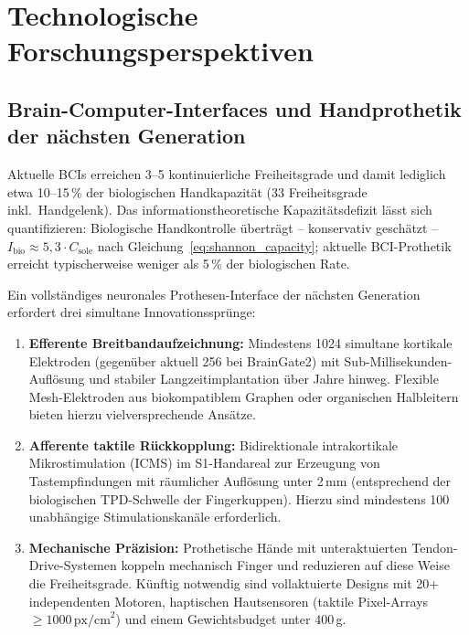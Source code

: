 ﻿\documentclass[12pt,a4paper]{report}
\theoremstyle{plain}
\theoremstyle{definition}
\theoremstyle{remark}
\begin{document}
\section{Technologische Forschungsperspektiven}

\subsection{Brain-Computer-Interfaces und Handprothetik der nächsten Generation}

Aktuelle BCIs erreichen 3--5 kontinuierliche Freiheitsgrade und damit
lediglich etwa 10--15\,\% der biologischen Handkapazität (33 Freiheitsgrade
inkl.\ Handgelenk). Das informationstheoretische Kapazitätsdefizit
lässt sich quantifizieren: Biologische Handkontrolle überträgt --
konservativ geschätzt -- $I_{\mathrm{bio}} \approx 5{,}3 \cdot
C_{\mathrm{sole}}$ nach Gleichung~\eqref{eq:shannon_capacity};
aktuelle BCI-Prothetik erreicht typischerweise weniger als 5\,\%
der biologischen Rate.

Ein vollständiges neuronales Prothesen-Interface der nächsten Generation
erfordert drei simultane Innovationssprünge:

\begin{enumerate}
\item \textbf{Efferente Breitbandaufzeichnung:} Mindestens 1024 simultane
  kortikale Elektroden (gegenüber aktuell 256 bei BrainGate2) mit
  Sub-Millisekunden-Auflösung und stabiler Langzeitimplantation über
  Jahre hinweg. Flexible Mesh-Elektroden aus biokompatiblem Graphen
  oder organischen Halbleitern bieten hierzu vielversprechende Ansätze.
\item \textbf{Afferente taktile Rückkopplung:} Bidirektionale
  intrakortikale Mikrostimulation (ICMS) im S1-Handareal zur Erzeugung
  von Tastempfindungen mit räumlicher Auflösung unter 2\,mm
  (entsprechend der biologischen TPD-Schwelle der Fingerkuppen).
  Hierzu sind mindestens 100 unabhängige Stimulationskanäle erforderlich.
\item \textbf{Mechanische Präzision:} Prothetische Hände mit
  unteraktuierten Tendon-Drive-Systemen koppeln mechanisch Finger
  und reduzieren auf diese Weise die Freiheitsgrade. Künftig notwendig
  sind vollaktuierte Designs mit 20+ independenten Motoren,
  haptischen Hautsensoren (taktile Pixel-Arrays $\geq 1000\,\text{px/cm}^2$)
  und einem Gewichtsbudget unter 400\,g.
\end{enumerate}
\end{document}
